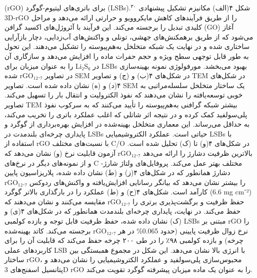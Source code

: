 \documentclass[12pt,a4paper,twocolumn]{article} %
\newcommand{\persian}[1]{\textfarsi{#1}}
\newcommand{\english}[1]{\textenglish{#1}}
\begin{document}
\persian{
(rGO) برای باتری‌های لیتیوم-گوگرد (\english{LSBs}).$^{۳۰}$ شکل ۴(الف) مکانیزم تشکیل پیشنهادی \english{3D-rGO} را از طریق فرآیندهای کاهش مایکروویو و حرارتی ارائه می‌دهد و مراحل کلیدی تبدیل را برجسته می‌کند. این فرآیند با آئروژل‌های اکسید گرافن (\english{GO}) آغاز می‌شود که از طریق برهمکنش‌های جهشی، تونلی و واکنش‌های آب‌زدایی، دچار بازآرایی ساختاری شده و در نهایت یک شبکه متخلخل به‌هم‌پیوسته را تشکیل می‌دهند. این تحول به طور قابل توجهی سطح ویژه و حجم حفرات ماده را افزایش می‌دهد و سازگاری آن را به عنوان میزبان برای \english{Li₂S₆} در \english{LSBs} بهبود می‌بخشد. مورفولوژی نمونه بهینه‌سازی شده \english{rGO₁₂.₇} در تصاویر \english{SEM} در شکل‌های ۴(ب) و (ج) و تصاویر \english{TEM} در شکل‌های ۴(د) و (ه) نشان داده شده است. تصاویر \english{SEM} یک ساختار متخلخل سلسله‌مراتبی به خوبی توسعه‌یافته را نشان می‌دهند که نفوذ الکترولیت و انتقال بار را تسهیل می‌کند. تصاویر \english{TEM} بیشتر شبکه گرافنی به‌هم‌پیوسته را تأیید می‌کنند که به سرکوب نفوذ پلی‌سولفید کمک کرده و در نتیجه اثر شاتلی که اغلب عملکرد باتری را تخریب می‌کند، به حداقل می‌رساند. این معماری متخلخل بهینه‌شده در افزایش بهره‌برداری از گوگرد و پایداری چرخه‌ای بلندمدت در \english{LSBs} حیاتی است. عملکرد الکتروشیمیایی \english{LSBs} با استفاده از \english{rGO} با نسبت‌های مختلف \english{C/O} در شکل‌های ۴(و) تا (ک) تحلیل شده است. آزمون قابلیت نرخ (و) نشان می‌دهد که \english{rGO₁₂.₇} بالاترین ظرفیت دشارژ را ارائه می‌دهد و از نمونه‌های دیگر در نرخ‌های \english{C} مختلف بهتر عمل می‌کند. پروفایل‌های ولتاژ شارژ-دشارژ همانطور که در شکل‌های ۴(ز) و (ط) نشان داده شده، پلاریزاسیون پایین \english{rGO₁₂.₇} را بیشتر نشان می‌دهد که بیانگر رسانایی افزایش‌یافته و واکنش‌های ردوکس کارآمد است. شکل‌های ۴(ح) و (ط) عملکرد را در بارگذاری بالاتر گوگرد (\english{6.6 mg cm⁻²}) مقایسه می‌کنند و نشان می‌دهند که \english{rGO₁₂.₇} حفظ ظرفیت و برگشت‌پذیری برتری را حفظ می‌کند.
}
\persian{
در نهایت، پایداری چرخه‌ای بلندمدت همانطور که در شکل‌های ۴(ی) و (ک) نشان داده شده، حفظ ظرفیت قابل توجه و بازده کولمبی \english{LSBs} مبتنی بر \english{rGO} را برجسته می‌کند. کاتد بهینه‌شده \english{rGO₁₂.₇} نرخ زوال ظرفیت پایینی (حدود \english{0.065\%} در هر چرخه) و بازده کولمبی ۹۸٪ را در طی ۲۰۰ چرخه حفظ می‌کند که قابلیت آن را برای کاربردهای عملی \english{LSB} با انرژی بالا نشان می‌دهد. این شکل در مجموع همبستگی بین ساختار \english{rGO}، محبوس‌سازی پلی‌سولفید و عملکرد الکتروشیمیایی را نشان می‌دهد و پتانسیل اسفنج‌های \english{3D rGO} را به عنوان یک ماده میزبان پیشرفته گوگرد تقویت می‌کند.
}
\end{document}
